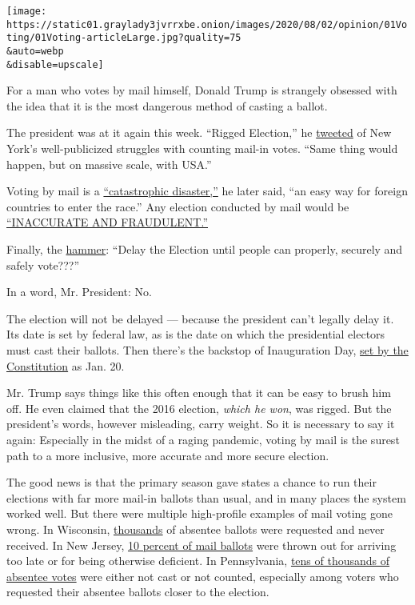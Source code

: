 \texttt{[image: https://static01.graylady3jvrrxbe.onion/images/2020/08/02/opinion/01Voting/01Voting-articleLarge.jpg?quality=75\\\&auto=webp\\\&disable=upscale]}

For a man who votes by mail himself, Donald Trump is strangely obsessed
with the idea that it is the most dangerous method of casting a ballot.

The president was at it again this week. ``Rigged Election,'' he
\href{https://twitter.com/realDonaldTrump/status/1288602262567153664}{tweeted}
of New York's well-publicized struggles with counting mail-in votes.
``Same thing would happen, but on massive scale, with USA.''

Voting by mail is a
\href{https://twitter.com/realDonaldTrump/status/1288809157722877952}{``catastrophic
disaster,''} he later said, ``an easy way for foreign countries to enter
the race.'' Any election conducted by mail would be
\href{https://twitter.com/realDonaldTrump/status/1288818160389558273}{``INACCURATE
AND FRAUDULENT.''}

Finally, the
\href{https://twitter.com/realDonaldTrump/status/1288818160389558273}{hammer}:
``Delay the Election until people can properly, securely and safely
vote???''

In a word, Mr. President: No.

The election will not be delayed --- because the president can't legally
delay it. Its date is set by federal law, as is the date on which the
presidential electors must cast their ballots. Then there's the backstop
of Inauguration Day,
\href{https://constitutioncenter.org/interactive-constitution/amendment/amendment-xx}{set
by the Constitution} as Jan. 20.

Mr. Trump says things like this often enough that it can be easy to
brush him off. He even claimed that the 2016 election, \emph{which he
won}, was rigged. But the president's words, however misleading, carry
weight. So it is necessary to say it again: Especially in the midst of a
raging pandemic, voting by mail is the surest path to a more inclusive,
more accurate and more secure election.

The good news is that the primary season gave states a chance to run
their elections with far more mail-in ballots than usual, and in many
places the system worked well. But there were multiple high-profile
examples of mail voting gone wrong. In Wisconsin,
\href{https://www.nytimes3xbfgragh.onion/2020/04/09/us/politics/wisconsin-election-absentee-coronavirus.html}{thousands}
of absentee ballots were requested and never received. In New Jersey,
\href{https://www.njspotlight.com/2020/06/one-in-10-ballots-rejected-in-last-months-vote-by-mail-elections/}{10
percent of mail ballots} were thrown out for arriving too late or for
being otherwise deficient. In Pennsylvania,
\href{https://www.inquirer.com/politics/election/pa-mail-ballot-deadlines-disenfranchisement-20200730.html}{tens
of thousands of absentee votes} were either not cast or not counted,
especially among voters who requested their absentee ballots closer to
the election.

